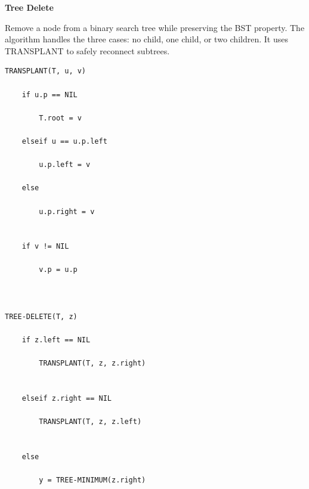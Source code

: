 \documentclass[a4paper,12pt]{article}
\begin{document}
\begin{tcolorbox}[
    colback=gray!30,
    colframe=black,
    boxrule=1pt,
    arc=0mm
]

\begin{tcolorbox}[
    colback=gray!10,
    colframe=black,
    arc=0mm
]
\centering
{\Huge\bfseries Tree Delete}
\end{tcolorbox}


\begin{tcolorbox}[
    colback=gray!10,
    colframe=black,
    arc=0mm
]
\small
Remove a node from a binary search tree while preserving the BST property.
The algorithm handles the three cases: no child, one child, or two children.
It uses TRANSPLANT to safely reconnect subtrees.
\end{tcolorbox}


\begin{tcolorbox}[
    colback=black!5,
    colframe=black,
    arc=0mm,
    title=Pseudo-code
]
\tiny
\begin{lstlisting}
TRANSPLANT(T, u, v)

    if u.p == NIL

        T.root = v

    elseif u == u.p.left

        u.p.left = v

    else

        u.p.right = v


    if v != NIL

        v.p = u.p



TREE-DELETE(T, z)

    if z.left == NIL

        TRANSPLANT(T, z, z.right)


    elseif z.right == NIL

        TRANSPLANT(T, z, z.left)


    else

        y = TREE-MINIMUM(z.right)



\end{lstlisting}
\end{tcolorbox}
\end{tcolorbox}
\end{document}
